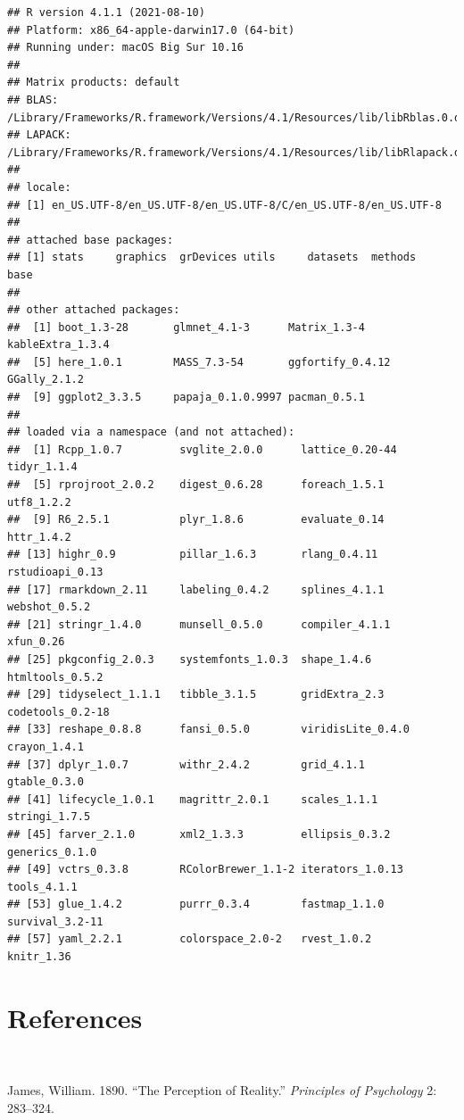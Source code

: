 \documentclass[
  11pt,
]{article}
\newlength{\cslhangindent}
\newlength{\cslentryspacingunit} %
\newenvironment{CSLReferences}[2] %
 {%
  \setlength{\parindent}{0pt}
  \ifodd #1
  \let\oldpar\par
  \def\par{\hangindent=\cslhangindent\oldpar}
  \fi
  \setlength{\parskip}{#2\cslentryspacingunit}
 }%
 {}
\begin{document}
\begin{verbatim}
## R version 4.1.1 (2021-08-10)
## Platform: x86_64-apple-darwin17.0 (64-bit)
## Running under: macOS Big Sur 10.16
## 
## Matrix products: default
## BLAS:   /Library/Frameworks/R.framework/Versions/4.1/Resources/lib/libRblas.0.dylib
## LAPACK: /Library/Frameworks/R.framework/Versions/4.1/Resources/lib/libRlapack.dylib
## 
## locale:
## [1] en_US.UTF-8/en_US.UTF-8/en_US.UTF-8/C/en_US.UTF-8/en_US.UTF-8
## 
## attached base packages:
## [1] stats     graphics  grDevices utils     datasets  methods   base     
## 
## other attached packages:
##  [1] boot_1.3-28       glmnet_4.1-3      Matrix_1.3-4      kableExtra_1.3.4 
##  [5] here_1.0.1        MASS_7.3-54       ggfortify_0.4.12  GGally_2.1.2     
##  [9] ggplot2_3.3.5     papaja_0.1.0.9997 pacman_0.5.1     
## 
## loaded via a namespace (and not attached):
##  [1] Rcpp_1.0.7         svglite_2.0.0      lattice_0.20-44    tidyr_1.1.4       
##  [5] rprojroot_2.0.2    digest_0.6.28      foreach_1.5.1      utf8_1.2.2        
##  [9] R6_2.5.1           plyr_1.8.6         evaluate_0.14      httr_1.4.2        
## [13] highr_0.9          pillar_1.6.3       rlang_0.4.11       rstudioapi_0.13   
## [17] rmarkdown_2.11     labeling_0.4.2     splines_4.1.1      webshot_0.5.2     
## [21] stringr_1.4.0      munsell_0.5.0      compiler_4.1.1     xfun_0.26         
## [25] pkgconfig_2.0.3    systemfonts_1.0.3  shape_1.4.6        htmltools_0.5.2   
## [29] tidyselect_1.1.1   tibble_3.1.5       gridExtra_2.3      codetools_0.2-18  
## [33] reshape_0.8.8      fansi_0.5.0        viridisLite_0.4.0  crayon_1.4.1      
## [37] dplyr_1.0.7        withr_2.4.2        grid_4.1.1         gtable_0.3.0      
## [41] lifecycle_1.0.1    magrittr_2.0.1     scales_1.1.1       stringi_1.7.5     
## [45] farver_2.1.0       xml2_1.3.3         ellipsis_0.3.2     generics_0.1.0    
## [49] vctrs_0.3.8        RColorBrewer_1.1-2 iterators_1.0.13   tools_4.1.1       
## [53] glue_1.4.2         purrr_0.3.4        fastmap_1.1.0      survival_3.2-11   
## [57] yaml_2.2.1         colorspace_2.0-2   rvest_1.0.2        knitr_1.36
\end{verbatim}

\hypertarget{references-1}{%
\section{References}\label{references-1}}

\(~\) \(~\)

\hypertarget{refs}{}
\begin{CSLReferences}{1}{0}
\leavevmode{}%
James, William. 1890. {``The Perception of Reality.''} \emph{Principles
of Psychology} 2: 283--324.

\end{CSLReferences}
\end{document}
